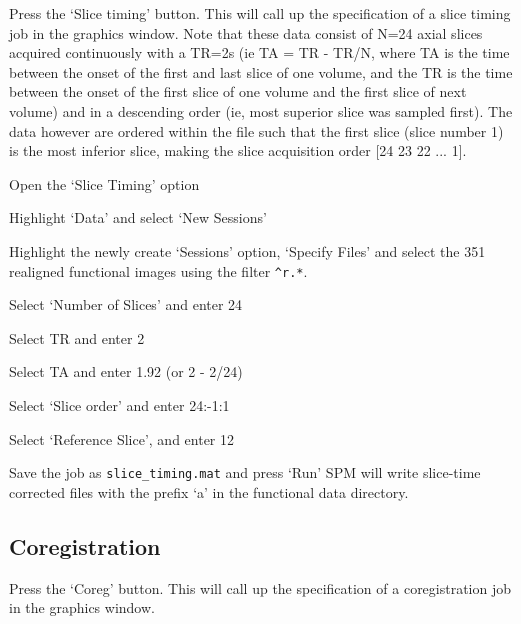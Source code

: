 Press the `Slice timing' button. This will call up the specification of a slice timing job in the graphics window. Note that these data consist of N=24 axial slices acquired continuously with a TR=2s (ie TA = TR - TR/N, where TA is the time between the onset of the first and last slice of one volume, and the TR is the time between the onset of the first slice of one volume and the first slice of next volume) and in a descending order (ie, most superior slice was sampled first). The data however are ordered within the file such that the first slice (slice number 1) is the most inferior slice, making the slice acquisition order [24 23 22 ... 1].
\bi
\item{Open the `Slice Timing' option}
\item{Highlight `Data' and select `New Sessions'}
\item{Highlight the newly create `Sessions' option, `Specify Files' and select the
351 realigned functional images using the 
filter \verb!^r.*!.}
\item{Select `Number of Slices' and enter 24}
\item{Select TR and enter 2}
\item{Select TA and enter 1.92 (or 2 - 2/24)}
\item{Select `Slice order' and enter 24:-1:1}
\item{Select `Reference Slice', and enter 12}
\item{Save the job as \verb!slice_timing.mat! and press `Run'}
\ei
SPM will write slice-time corrected files with 
the prefix `a' in the functional data directory.

\subsection{Coregistration}

Press the `Coreg' button. This will call up the specification of a coregistration job in the graphics 
window. 

